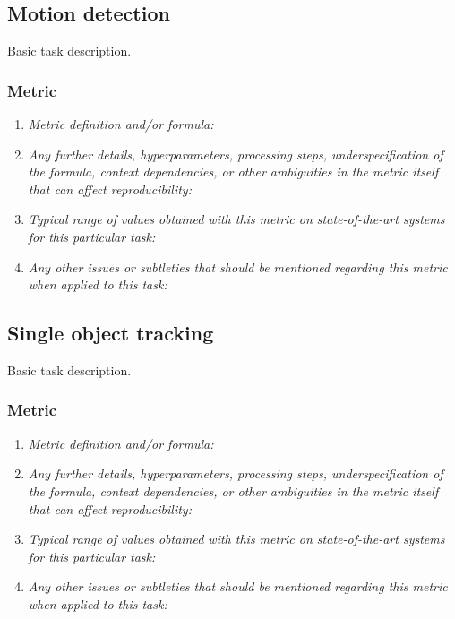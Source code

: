 \documentclass[a4paper,11pt]{article}
\begin{document}
\subsection{Motion detection}
    Basic task description.
    \subsubsection{Metric}
        \begin{enumerate}[label=\alph*.]
            \item \textit{Metric definition and/or formula:}
            \bigskip
            \item \textit{Any further details, hyperparameters, processing steps, underspecification of the formula, context dependencies, or other ambiguities in the metric itself that can affect reproducibility:}
            \bigskip
            \item \textit{Typical range of values obtained with this metric on state-of-the-art systems for this particular task:}
            \bigskip
            \item \textit{Any other issues or subtleties that should be mentioned regarding this metric when applied to this task:}
            \bigskip
        \end{enumerate}

\subsection{Single object tracking}
    Basic task description.
    \subsubsection{Metric}
        \begin{enumerate}[label=\alph*.]
            \item \textit{Metric definition and/or formula:}
            \bigskip
            \item \textit{Any further details, hyperparameters, processing steps, underspecification of the formula, context dependencies, or other ambiguities in the metric itself that can affect reproducibility:}
            \bigskip
            \item \textit{Typical range of values obtained with this metric on state-of-the-art systems for this particular task:}
            \bigskip
            \item \textit{Any other issues or subtleties that should be mentioned regarding this metric when applied to this task:}
            \bigskip
        \end{enumerate}
\end{document}
